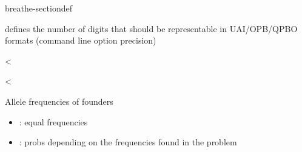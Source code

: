 \documentclass[letterpaper,10pt,openany,oneside,english]{sphinxmanual}
\begin{document}
\begin{fulllineitems}
\begin{sphinxuseclass}{breathe-sectiondef}
\begin{fulllineitems}
\sphinxAtStartPar
defines the number of digits that should be representable in UAI/OPB/QPBO formats (command line option \sphinxhyphen{}precision) 

\end{fulllineitems}


\begin{fulllineitems}
\label{\detokenize{ref/ref_cpp:_CPPv4N8ToulBar210NormFactorE}}\label{\detokenize{ref/ref_cpp:_CPPv3N8ToulBar210NormFactorE}}\label{\detokenize{ref/ref_cpp:_CPPv2N8ToulBar210NormFactorE}}\label{\detokenize{ref/ref_cpp:ToulBar2::NormFactor__TLogProb}}
\pysigstartsignatures
\pysigstartmultiline
{}
\pysigstopmultiline
\pysigstopsignatures
\sphinxAtStartPar
\textless{} 

\end{fulllineitems}


\begin{fulllineitems}
\label{\detokenize{ref/ref_cpp:_CPPv4N8ToulBar218foundersprob_classE}}\label{\detokenize{ref/ref_cpp:_CPPv3N8ToulBar218foundersprob_classE}}\label{\detokenize{ref/ref_cpp:_CPPv2N8ToulBar218foundersprob_classE}}\label{\detokenize{ref/ref_cpp:ToulBar2::foundersprob_class__i}}
\pysigstartsignatures
\pysigstartmultiline
{}
\pysigstopmultiline
\pysigstopsignatures
\sphinxAtStartPar
\textless{} 

\sphinxAtStartPar
Allele frequencies of founders\begin{itemize}
\item {} 
: equal frequencies

\item {} 
: probs depending on the frequencies found in the problem


\end{itemize}
\end{fulllineitems}
\end{sphinxuseclass}
\end{fulllineitems}
\end{document}
